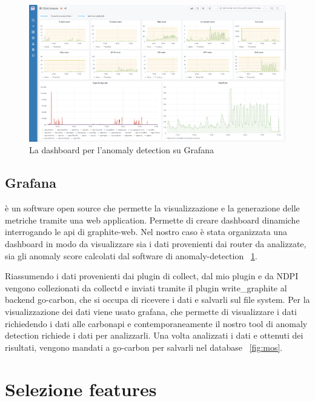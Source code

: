 \begin{figure}[h]
    \label{fig:grafana}
    \includegraphics[width=\hsize]{images/my_work/grafana_dashboard.png}
    \caption{La dashboard per l'anomaly detection su Grafana}
    \centering
\end{figure}

\subsection{Grafana} è un software open source che permette la visualizzazione e la generazione delle metriche tramite una web application. Permette di creare dashboard dinamiche interrogando le api di graphite-web. Nel nostro caso è stata organizzata una dashboard in modo da visualizzare sia i dati provenienti dai router da analizzate, sia gli anomaly score calcolati dal software di anomaly-detection ~\ref{fig:grafana}.


Riassumendo i dati provenienti dai plugin di collect, dal mio plugin e da NDPI vengono collezionati da collectd e inviati tramite il plugin write\_graphite al backend go-carbon, che si occupa di ricevere i dati e salvarli sul file system. Per la visualizzazione dei dati viene usato grafana, che permette di visualizzare i dati richiedendo i dati alle carbonapi e contemporaneamente il nostro tool di anomaly detection richiede i dati per analizzarli. Una volta analizzati i dati e ottenuti dei risultati, vengono mandati a go-carbon per salvarli nel database ~\ref{fig:mos}.


\section{Selezione features}

